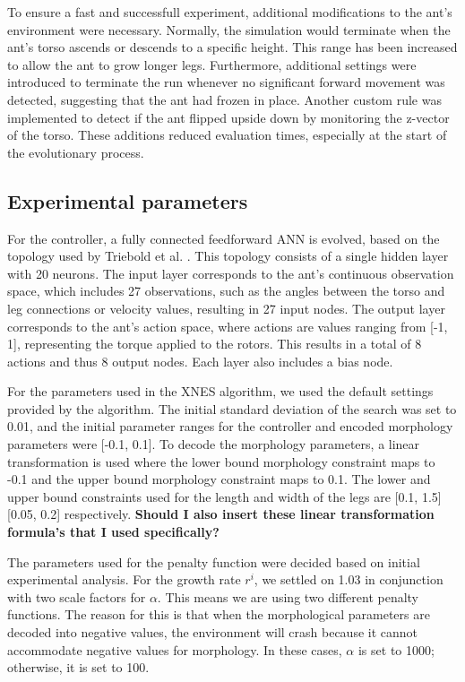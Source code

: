         To ensure a fast and successfull experiment, additional modifications to the ant's environment were necessary. Normally, the simulation would terminate when the ant's torso ascends or descends to a specific height. This range has been increased to allow the ant to grow longer legs. Furthermore, additional settings were introduced to terminate the run whenever no significant forward movement was detected, suggesting that the ant had frozen in place. Another custom rule was implemented to detect if the ant flipped upside down by monitoring the z-vector of the torso. These additions reduced evaluation times, especially at the start of the evolutionary process.

    \subsection{Experimental parameters}
        For the controller, a fully connected feedforward ANN is evolved, based on the topology used by Triebold et al. \cite{Corinna_Triebold}. This topology consists of a single hidden layer with 20 neurons. The input layer corresponds to the ant's continuous observation space, which includes 27 observations, such as the angles between the torso and leg connections or velocity values, resulting in 27 input nodes. The output layer corresponds to the ant's action space, where actions are values ranging from [-1, 1], representing the torque applied to the rotors. This results in a total of 8 actions and thus 8 output nodes. Each layer also includes a bias node.
        
        For the parameters used in the XNES algorithm, we used the default settings provided by the algorithm. The initial standard deviation of the search was set to 0.01, and the initial parameter ranges for the controller and encoded morphology parameters were [-0.1, 0.1]. To decode the morphology parameters, a linear transformation is used where the lower bound morphology constraint maps to -0.1 and the upper bound morphology constraint maps to 0.1. The lower and upper bound constraints used for the length and width of the legs are [0.1, 1.5] [0.05, 0.2] respectively. \textbf{Should I also insert these linear transformation formula's that I used specifically?}
        
        The parameters used for the penalty function were decided based on initial experimental analysis. For the growth rate $r^i$, we settled on 1.03 in conjunction with two scale factors for $\alpha$. This means we are using two different penalty functions. The reason for this is that when the morphological parameters are decoded into negative values, the environment will crash because it cannot accommodate negative values for morphology. In these cases, $\alpha$ is set to 1000; otherwise, it is set to 100.
        
